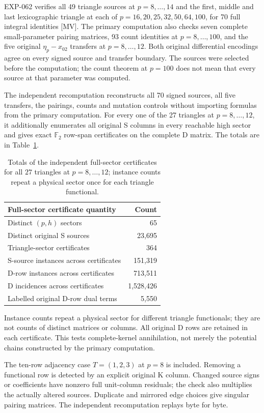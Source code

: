 \documentclass[11pt]{article}
\theoremstyle{definition}
\theoremstyle{remark}
\begin{document}
EXP-062 verifies all 49 triangle sources at $p=8,\ldots,14$ and the
first, middle and last lexicographic triangle at each of
$p=16,20,25,32,50,64,100$, for 70 full integral identities [MV].
The primary computation also checks seven complete small-parameter pairing
matrices, 93 count identities at $p=8,\ldots,100$, and the five original
$\eta_p-x_{02}$ transfers at $p=8,\ldots,12$. Both original
differential encodings agree on every signed source and transfer boundary.
The sources were selected before the computation; the count theorem at
$p=100$ does not mean that every source at that parameter was computed.

The independent recomputation reconstructs all 70 signed sources, all five
transfers, the pairings, counts and mutation controls without importing
formulas from the primary computation. For every one of the 27 triangles at
$p=8,\ldots,12$, it additionally enumerates all original S columns
in every reachable high sector and gives exact $\mathbb F_2$ row-span
certificates on the complete D matrix. The totals are in Table~\ref{tab:sectorcert}.
\begin{table}[t]
\centering\small
\begin{tabular}{lr}
\toprule
Full-sector certificate quantity & Count\\
\midrule
Distinct $(p,h)$ sectors & 65\\
Distinct original S sources & 23,695\\
Triangle-sector certificates & 364\\
S-source instances across certificates & 151,319\\
D-row instances across certificates & 713,511\\
D incidences across certificates & 1,528,426\\
Labelled original D-row dual terms & 5,550\\
\bottomrule
\end{tabular}
\caption{Totals of the independent full-sector certificates for all $27$ triangles at $p=8,\ldots,12$;
instance counts repeat a physical sector once for each triangle functional.}
\label{tab:sectorcert}
\end{table}
Instance counts repeat a physical sector for different triangle functionals;
they are not counts of distinct matrices or columns. All original D rows
are retained in each certificate. This tests complete-kernel annihilation,
not merely the potential chains constructed by the primary computation.

The ten-row adjacency case $T=(1,2,3)$ at $p=8$ is included. Removing
a functional row is detected by an explicit original K column. Changed
source signs or coefficients have nonzero full unit-column residuals;
the check also multiplies the actually altered sources. Duplicate
and mirrored edge choices give singular pairing matrices. The independent
recomputation replays byte for byte.
\end{document}
